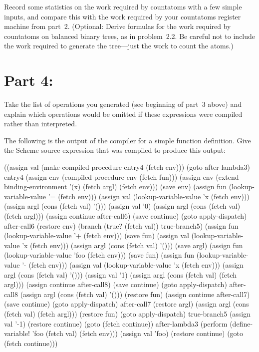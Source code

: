  Record some statistics on the work required by
{\cf countatoms} with a few simple inputs, and compare this with the
work required by your {\cf countatoms} register machine from part~2.
(Optional: Derive formulas for the work required by {\cf countatoms}
on balanced binary trees, as in problem~2.2.  Be careful not to
include the work required to generate the tree---just the work to
count the atoms.)


\section{Part 4:  }

 Take the list of operations you generated
(see beginning of part~3 above) and explain which operations would be
omitted if these expressions were compiled rather than interpreted.

 The following is the output of the compiler
for a simple function definition.  Give the {\sc Scheme} source expression
that was compiled to produce this output:

\beginlisp
((assign val (make-compiled-procedure entry4 (fetch env)))
 (goto after-lambda3)
\null
 entry4
 (assign env (compiled-procedure-env (fetch fun)))
 (assign env (extend-binding-environment '(x) (fetch argl) (fetch env)))
 (save env)
 (assign fun (lookup-variable-value '= (fetch env)))
 (assign val (lookup-variable-value 'x (fetch env)))
 (assign argl (cons (fetch val) '()))
 (assign val '0)
 (assign argl (cons (fetch val) (fetch argl)))
 (assign continue after-call6)
 (save continue)
 (goto apply-dispatch)
\endlisp
\beginlisp
\null
 after-call6
 (restore env)
 (branch (true? (fetch val)) true-branch5)
 (assign fun (lookup-variable-value '+ (fetch env)))
 (save fun)
 (assign val (lookup-variable-value 'x (fetch env)))
 (assign argl (cons (fetch val) '()))
 (save argl)
 (assign fun (lookup-variable-value 'foo (fetch env)))
 (save fun)
 (assign fun (lookup-variable-value '- (fetch env)))
 (assign val (lookup-variable-value 'x (fetch env)))
 (assign argl (cons (fetch val) '()))
 (assign val '1)
 (assign argl (cons (fetch val) (fetch argl)))
 (assign continue after-call8)
 (save continue)
 (goto apply-dispatch)
\endlisp
\beginlisp
\null
 after-call8
 (assign argl (cons (fetch val) '()))
 (restore fun)
 (assign continue after-call7)
 (save continue)
 (goto apply-dispatch)
\null
 after-call7
 (restore argl)
 (assign argl (cons (fetch val) (fetch argl)))
 (restore fun)
 (goto apply-dispatch)
\null
 true-branch5
 (assign val '-1)
 (restore continue)
 (goto (fetch continue))
\null
 after-lambda3
 (perform (define-variable! 'foo (fetch val) (fetch env)))
 (assign val 'foo)
 (restore continue)
 (goto (fetch continue)))
\endlisp

